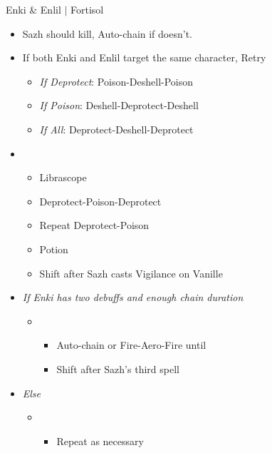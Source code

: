 \begin{battle}[1:41 $|$ 1:30]{Enki \& Enlil $|$ Fortisol}
\begin{multicols}{2}
\begin{itemize}
\begin{itemize}
              \item Sazh should kill, Auto-chain if doesn't.
            \end{itemize}
    \end{itemize}
    \columnbreak
    \begin{itemize}
      \item If both Enki and Enlil target the same character, Retry
            \begin{itemize}
              \item \textit{If Deprotect}: Poison-Deshell-Poison
              \item \textit{If Poison}: Deshell-Deprotect-Deshell
              \item \textit{If All}: Deprotect-Deshell-Deprotect
            \end{itemize}
      \item \third
            \begin{itemize}
              \item Librascope
              \item Deprotect-Poison-Deprotect
              \item Repeat Deprotect-Poison
              \item Potion
              \item Shift after Sazh casts Vigilance on Vanille
            \end{itemize}
      \item \textit{If Enki has two debuffs and enough chain duration}
            \begin{itemize}
              \item \fourth
                    \begin{itemize}
                      \item Auto-chain or Fire-Aero-Fire until \stagger
                      \item Shift after Sazh's third spell
                    \end{itemize}
            \end{itemize}
      \item \textit{Else}
            \begin{itemize}
              \item \fifth
                    \begin{itemize}
                      \item Repeat as necessary
                    \end{itemize}
            \end{itemize}

\end{itemize}
\end{multicols}
\end{battle}
